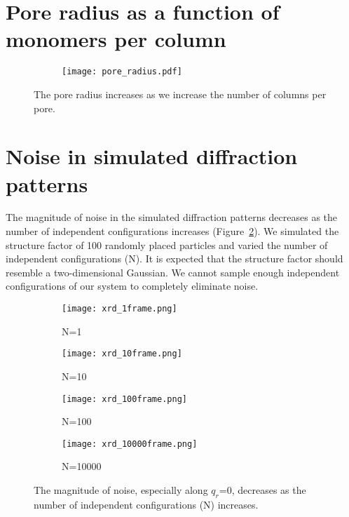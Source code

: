   \clearpage
 
  \section{Pore radius as a function of monomers per column}\label{S-section:pore_radius} 
  
  \begin{figure}[!htb]
  \centering
  \begin{subfigure}{\linewidth}
  \texttt{[image: pore\_radius.pdf]}
  \end{subfigure}
  \caption{The pore radius increases as we increase the number of columns per pore.}\label{S-fig:pore_radius}
  \end{figure}
 
  \clearpage
  \section{Noise in simulated diffraction patterns}\label{S-section:xrd_noise}
  
  The magnitude of noise in the simulated diffraction patterns decreases as 
  the number of independent configurations increases (Figure~\ref{S-fig:xrd_noise}).
  We simulated the structure factor of 100 randomly placed particles and varied 
  the number of independent configurations (N). It is expected that the structure
  factor should resemble a two-dimensional Gaussian. We cannot sample enough 
  independent configurations of our system to completely eliminate noise.
  
  \begin{figure}[!htb]
  \centering
  \begin{subfigure}{0.45\linewidth}
  \centering
  \texttt{[image: xrd\_1frame.png]}
  \caption{N=1}
  \end{subfigure}
  \begin{subfigure}{0.45\linewidth}
  \centering
  \texttt{[image: xrd\_10frame.png]}
  \caption{N=10}
  \end{subfigure}
  \begin{subfigure}{0.45\linewidth}
  \centering
  \texttt{[image: xrd\_100frame.png]}
  \caption{N=100}
  \end{subfigure}
  \begin{subfigure}{0.45\linewidth}
  \centering
  \texttt{[image: xrd\_10000frame.png]}
  \caption{N=10000}
  \end{subfigure}
  \caption{The magnitude of noise, especially along $q_r$=0, decreases
  as the number of independent configurations (N) increases.}\label{S-fig:xrd_noise}
  \end{figure}
  
